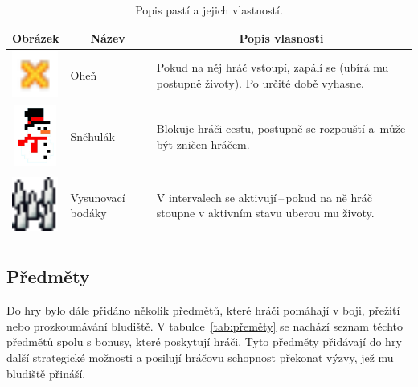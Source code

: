 \vline

\begin{table}[H]
    \centering
    \begin{tabular}{|m{2cm}|m{2cm}|m{8cm}|}
    \hline
    \multicolumn{1}{|c|}{\textbf{Obrázek}} & \multicolumn{1}{c|}{\textbf{Název}} & \multicolumn{1}{c|}{\textbf{Popis vlasnosti}} \\
    \hline
    \hline
    \centering\includegraphics[width=1.5cm,height=1.5cm]{obrazky-figures/ch3/fire.png} & Oheň & Pokud na něj hráč vstoupí, zapálí se (ubírá mu postupně životy). Po určité době vyhasne. \\
    \hline
    \centering\includegraphics[width=1.5cm,height=2cm]{obrazky-figures/ch3/snowman.png} & Sněhulák & Blokuje hráči cestu, postupně se rozpouští a~může být zničen hráčem. \\
    \hline
    \centering\includegraphics[width=1.5cm,height=2cm]{obrazky-figures/ch3/trap.png} & Vysunovací bodáky & V intervalech se aktivují\,--\,pokud na ně hráč stoupne v aktivním stavu uberou mu životy. \\
    \hline
    \end{tabular}
    \caption{Popis pastí a jejich vlastností.}
    \label{tab:pasti}
\end{table}

\subsection*{Předměty}
Do hry bylo dále přidáno několik předmětů, které hráči pomáhají v boji, přežití nebo prozkoumávání bludiště. V tabulce~\ref{tab:přeměty} se nachází seznam těchto předmětů spolu s bonusy, které poskytují hráči. Tyto předměty přidávají do hry další strategické možnosti a posilují hráčovu schopnost překonat výzvy, jež mu bludiště přináší.

